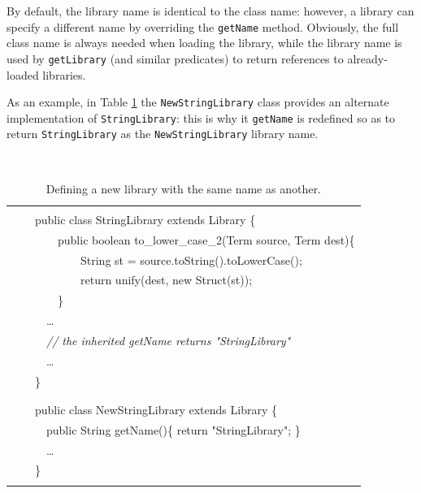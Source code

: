 By default, the library name is identical to the class name: however, a library can specify a different name by overriding the \texttt{getName} method.
%
Obviously, the full class name is always needed when loading the library, while the library name is used by \texttt{getLibrary} (and similar predicates) to return references to already-loaded libraries.

As an example, in Table \ref{tab:StringLibrary-NewStringLibrary} the \texttt{NewStringLibrary} class provides an alternate implementation of \texttt{StringLibrary}: this is why it \texttt{getName} is redefined so as to return \texttt{StringLibrary} as the \texttt{NewStringLibrary} library name.

\begin{table}
    \begin{center}{\tt
    \begin{tabular}{p{13.5cm}}\hline
    \\
    \mbox{~~~~}public class StringLibrary extends Library \{\\
    \mbox{~~~~~~~~}public boolean to\_lower\_case\_2(Term source, Term dest)\{\\
    \mbox{~~~~~~~~~~~~}String st = source.toString().toLowerCase();\\
    \mbox{~~~~~~~~~~~~}return unify(dest, new Struct(st));\\
    \mbox{~~~~~~~~}\}\\
    \mbox{~~~~~~}\ldots\\
    \mbox{~~~~~~}\textit{// the inherited getName returns "StringLibrary"}\\
    \mbox{~~~~~~}\ldots\\
    \mbox{~~~~}\}\\
    \\
    \hline
    \\
    \mbox{~~~~}public class NewStringLibrary extends Library \{\\
    \mbox{~~~~~~}public String getName()\{ return "StringLibrary"; \}\\
    \mbox{~~~~~~}\ldots\\
    \mbox{~~~~}\}\\
    \\
    \hline
    \end{tabular}
    }\end{center}
    \caption{Defining a new library with the same name as another.}
    \label{tab:StringLibrary-NewStringLibrary}
\end{table}


